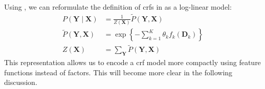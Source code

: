 \bigskip

Using , we can reformulate the definition of \glspl{crf} in  as a \gls{log-linear model}:
\begin{equation}
  \label{equ:crf-log-linear}
  \begin{split}
    P(\mathbf{Y}\mid\mathbf{X}) & = \frac{1}{Z(\mathbf{X})}\tilde{P}(\mathbf{Y},\mathbf{X}) \\
    \tilde{P}(\mathbf{Y},\mathbf{X}) & = \exp\left\{ -\sum_{k=1}^K \theta_k f_k\left(\mathbf{D}_k\right)\right\} \\
    Z(\mathbf{X}) & = \sum_{\mathbf{Y}}\tilde{P}(\mathbf{Y},\mathbf{X})
  \end{split}
\end{equation}
This representation allows us to encode a \gls{crf} model more compactly using \glspl{feature function} instead of \glspl{factor}.
This will become more clear in the following discussion.

\bigskip

